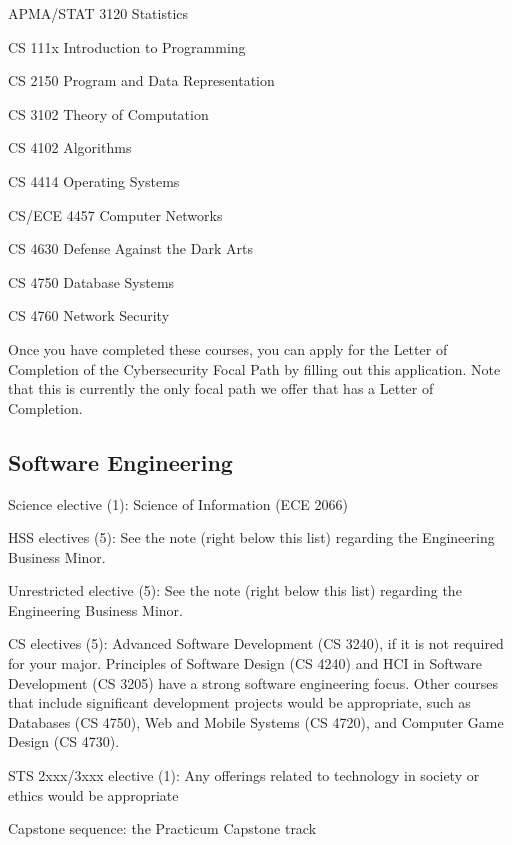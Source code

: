 \begin{itemlist}
\item APMA/STAT 3120 Statistics
\item CS 111x Introduction to Programming
\item CS 2150 Program and Data Representation
\item CS 3102 Theory of Computation
\item CS 4102 Algorithms
\item CS 4414 Operating Systems
\item CS/ECE 4457 Computer Networks
\item CS 4630 Defense Against the Dark Arts
\item CS 4750 Database Systems
\item CS 4760 Network Security
\end{itemlist}

Once you have completed these courses, you can apply for the Letter of
Completion of the Cybersecurity Focal Path by filling out
this application.
Note that this is currently the only focal path we offer that has a 
Letter of Completion.

\iffalse

\subsection{Software Engineering}
\begin{itemlist}
\item Science elective (1): Science of Information (ECE 2066)
\item HSS electives (5): See the note (right below this list)
  regarding the Engineering Business Minor.
\item Unrestricted elective (5): See the note (right below this list)
  regarding the Engineering Business Minor.
\item CS electives (5): Advanced Software Development (CS 3240), if it
  is not required for your major.  Principles of Software Design (CS
  4240) and HCI in Software Development (CS 3205) have a strong
  software engineering focus. Other courses that include significant
  development projects would be appropriate, such as Databases (CS
  4750), Web and Mobile Systems (CS 4720), and Computer Game Design
  (CS 4730).
\item STS 2xxx/3xxx elective (1): Any offerings related to technology
  in society or ethics would be appropriate
\item Capstone sequence: the Practicum Capstone track
\end{itemlist}

